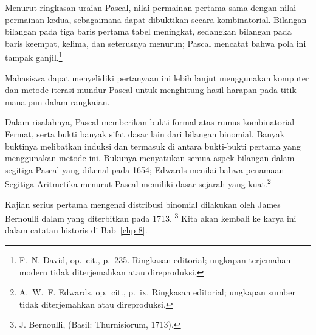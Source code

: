\noindent Menurut ringkasan uraian Pascal, nilai permainan pertama sama dengan nilai
permainan kedua, sebagaimana dapat dibuktikan secara kombinatorial. Bilangan-bilangan pada
tiga baris pertama tabel meningkat, sedangkan bilangan pada baris keempat, kelima, dan
seterusnya menurun; Pascal mencatat bahwa pola ini tampak ganjil.\footnote{F.\ N. David,
op.\ cit., p.~235. Ringkasan editorial; ungkapan terjemahan modern tidak diterjemahkan
atau direproduksi.}
\par Mahasiswa dapat menyelidiki pertanyaan ini lebih lanjut menggunakan komputer dan
metode iterasi mundur Pascal untuk menghitung hasil harapan pada titik mana pun dalam
rangkaian.
\par Dalam risalahnya, Pascal memberikan bukti formal atas rumus kombinatorial Fermat,
serta bukti banyak sifat dasar lain dari bilangan binomial.  Banyak buktinya melibatkan
induksi dan termasuk di antara bukti-bukti pertama yang menggunakan metode ini.  Bukunya
menyatukan semua aspek bilangan dalam segitiga Pascal yang dikenal pada 1654; Edwards
menilai bahwa penamaan Segitiga Aritmetika menurut Pascal memiliki dasar sejarah yang
kuat.\footnote{A.~W.~F. Edwards, op.\ cit.,
p.~ix. Ringkasan editorial; ungkapan sumber tidak diterjemahkan atau direproduksi.}
\par Kajian serius pertama mengenai distribusi binomial dilakukan oleh James Bernoulli
dalam  yang diterbitkan pada 1713.
\footnote{J. Bernoulli,  (Basil: Thurnisiorum, 1713).}  Kita akan
kembali ke karya ini dalam catatan historis di Bab~\ref{chp 8}.

